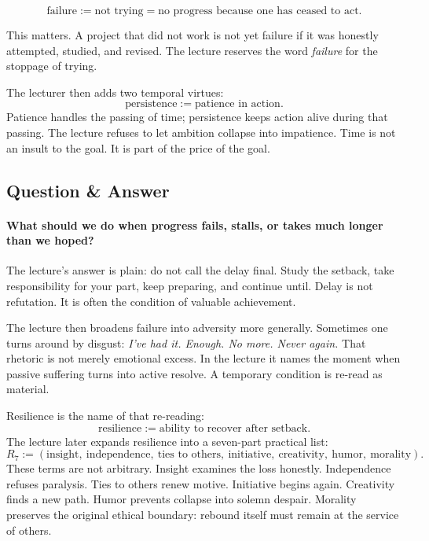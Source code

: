 \begin{definition}
\[
\text{failure} := \text{not trying} = \text{no progress because one has ceased to act}.
\]
\end{definition}
This matters. A project that did not work is not yet failure if it was honestly attempted, studied, and revised. The lecture reserves the word \emph{failure} for the stoppage of trying.

The lecturer then adds two temporal virtues:
\begin{equation}
\text{persistence} := \text{patience in action}.
\end{equation}
Patience handles the passing of time; persistence keeps action alive during that passing. The lecture refuses to let ambition collapse into impatience. Time is not an insult to the goal. It is part of the price of the goal.

\subsection{Question \& Answer}

\paragraph{What should we do when progress fails, stalls, or takes much longer than we hoped?}
The lecture's answer is plain: do not call the delay final. Study the setback, take responsibility for your part, keep preparing, and continue until. Delay is not refutation. It is often the condition of valuable achievement.

The lecture then broadens failure into adversity more generally. Sometimes one turns around by disgust: \emph{I've had it. Enough. No more. Never again.} That rhetoric is not merely emotional excess. In the lecture it names the moment when passive suffering turns into active resolve. A temporary condition is re-read as material.

Resilience is the name of that re-reading:
\begin{equation}
\text{resilience} := \text{ability to recover after setback}.
\end{equation}
The lecture later expands resilience into a seven-part practical list:
\begin{equation}
R_7 := (\text{insight},\ \text{independence},\ \text{ties to others},\ \text{initiative},\ \text{creativity},\ \text{humor},\ \text{morality}).
\end{equation}
These terms are not arbitrary. Insight examines the loss honestly. Independence refuses paralysis. Ties to others renew motive. Initiative begins again. Creativity finds a new path. Humor prevents collapse into solemn despair. Morality preserves the original ethical boundary: rebound itself must remain at the service of others.

